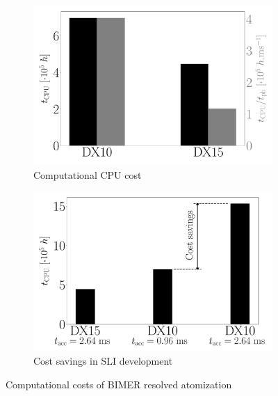 \begin{figure}[ht]
	\flushleft
\begin{subfigure}[b]{0.45\textwidth}
	\flushleft
	\includegraphics[scale=0.22]{./part3_applications/figures_ch8_resolved/SLI_cost_for_convergence/cost_all_simulations}
	\caption{Computational CPU cost}
   \label{fig:BIMER_costs_bar_graphs_costs_absolute}
\end{subfigure}
\hfill
\begin{subfigure}[b]{0.45\textwidth}
	\flushleft
   \includegraphics[scale=0.22]{./part3_applications/figures_ch8_resolved/SLI_cost_for_convergence/cost_savings_simulations}
	\caption{Cost savings in SLI development}
   \label{fig:BIMER_costs_bar_graphs_cost_savints}
\end{subfigure}
   \caption{Computational costs of BIMER resolved atomization}
\label{fig:ch8_sli_cost_bar_graphs_savings}
\end{figure}




